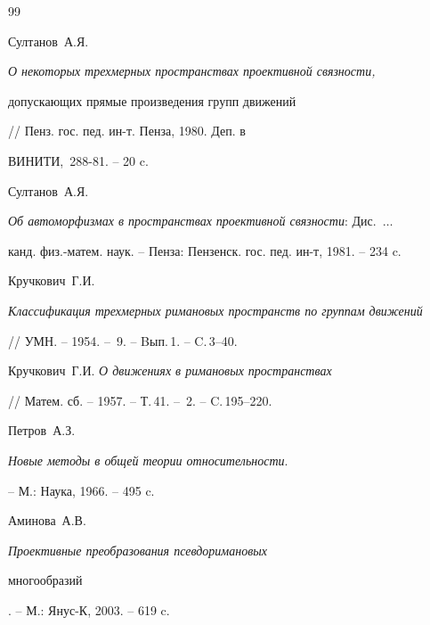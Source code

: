 \begin{thebibliography}{99}


Султанов~А.Я.


{\em О некоторых трехмерных пространствах проективной связности,


допускающих прямые произведения групп движений}


// Пенз. гос. пед. ин-т. Пенза, 1980. Деп. в


ВИНИТИ, \No\,288-81. -- 20 c.







Султанов~А.Я.


{\em Об автоморфизмах в пространствах проективной связности}: Дис.~$\dotsc$


канд. физ.-матем. наук. -- Пенза: Пензенск. гос. пед. ин-т, 1981. -- 234 c.







Кручкович~Г.И.


{\em Классификация трехмерных римановых пространств по группам движений}


// УМН. -- 1954. -- \No\,9. -- Bып.\,1. -- C.\,3--40.







Кручкович~Г.И. {\em О движениях в римановых пространствах}


// Матем. сб. -- 1957. -- Т.\,41. -- \No\,2. -- C.\,195--220.







Петров~А.З.


{\em Новые методы в общей теории относительности}.


-- М.: Наука, 1966. -- 495 c.







Аминова~А.В.


{\em Проективные преобразования псевдоримановых


многообразий}. -- М.: Янус-К, 2003. -- 619 c.










\end{thebibliography}
